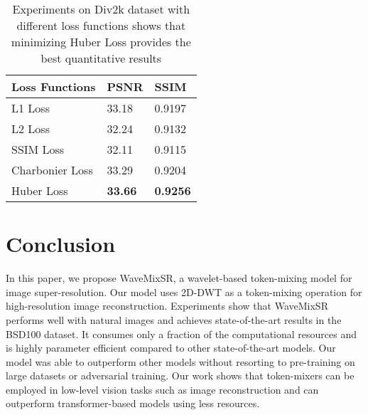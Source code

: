 \documentclass{article}
\begin{document}
\begin{table}[]
\centering
\begin{tabular}{@{}lll@{}}
\toprule
Loss Functions & PSNR & SSIM\\ \midrule
L1 Loss & 33.18 & 0.9197\\
L2 Loss & 32.24 & 0.9132\\
SSIM Loss & 32.11 & 0.9115\\
Charbonier Loss & 33.29 & 0.9204 \\
Huber Loss & \textbf{33.66} & \textbf{0.9256}\\ \bottomrule
\end{tabular}
\vspace{2mm}
\caption{Experiments on Div2k dataset with different loss functions shows that minimizing Huber Loss provides the best quantitative results}
\label{tab:loss}
\end{table}

\section{Conclusion}

In this paper, we propose WaveMixSR, a wavelet-based token-mixing model for image super-resolution. Our model uses 2D-DWT as a token-mixing operation for high-resolution image reconstruction. Experiments show that WaveMixSR performs well with natural images and achieves state-of-the-art results in the BSD100 dataset. It consumes only a fraction of the computational resources and is highly parameter efficient compared to other state-of-the-art models. Our model was able to outperform other models without resorting to pre-training on large datasets or adversarial training\cite{ledig2017photorealistic}. Our work shows that token-mixers can be employed in low-level vision tasks such as image reconstruction and can outperform transformer-based models using less resources.

  
  
\end{document}
